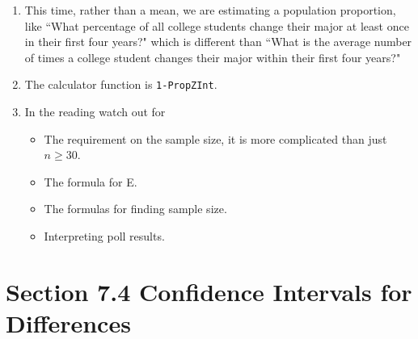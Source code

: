 \documentclass{article}
\begin{document}
\begin{enumerate}

    \item This time, rather than a mean, we are estimating a population proportion, like ``What percentage of all college students change their major at least once in their first four years?"  which is different than ``What is the average number of times a college student changes their major within their first four years?"
    
    \item The calculator function is \texttt{1-PropZInt}.
    
    \item In the reading watch out for
    
        \begin{itemize}
        
            \item The requirement on the sample size, it is more complicated than just $n \geq 30$.
            
            \item The formula for E.
            
            \item The formulas for finding sample size.
            
            \item Interpreting poll results.
            
        \end{itemize}
        
\end{enumerate}

\newpage

\section*{Section 7.4 Confidence Intervals for Differences}
\end{document}

